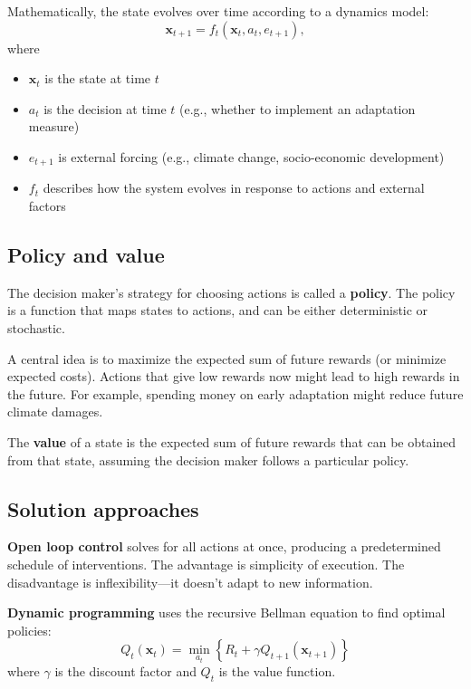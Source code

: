 \documentclass[
  letterpaper,
  DIV=11,
  numbers=noendperiod]{scrreprt}
\providecommand{\tightlist}{%
  \setlength{\itemsep}{0pt}\setlength{\parskip}{0pt}}
\begin{document}
Mathematically, the state evolves over time according to a dynamics
model: \[
\mathbf{x}_{t+1} = f_t(\mathbf{x}_t, a_t, e_{t+1}),
\] where

\begin{itemize}
\tightlist
\item
  \(\mathbf{x}_t\) is the state at time \(t\)
\item
  \(a_t\) is the decision at time \(t\) (e.g., whether to implement an
  adaptation measure)
\item
  \(e_{t+1}\) is external forcing (e.g., climate change, socio-economic
  development)\\
\item
  \(f_t\) describes how the system evolves in response to actions and
  external factors
\end{itemize}

\subsection{Policy and value}\label{policy-and-value}

The decision maker's strategy for choosing actions is called a
\textbf{policy}. The policy is a function that maps states to actions,
and can be either deterministic or stochastic.

A central idea is to maximize the expected sum of future rewards (or
minimize expected costs). Actions that give low rewards now might lead
to high rewards in the future. For example, spending money on early
adaptation might reduce future climate damages.

The \textbf{value} of a state is the expected sum of future rewards that
can be obtained from that state, assuming the decision maker follows a
particular policy.

\subsection{Solution approaches}\label{solution-approaches}

\textbf{Open loop control} solves for all actions at once, producing a
predetermined schedule of interventions. The advantage is simplicity of
execution. The disadvantage is inflexibility---it doesn't adapt to new
information.

\textbf{Dynamic programming} uses the recursive Bellman equation to find
optimal policies: \[
Q_t(\mathbf{x}_t) = \min_{a_t} \left\{ R_t + \gamma Q_{t+1} (\mathbf{x}_{t+1}) \right\}
\] where \(\gamma\) is the discount factor and \(Q_t\) is the value
function.
\end{document}
